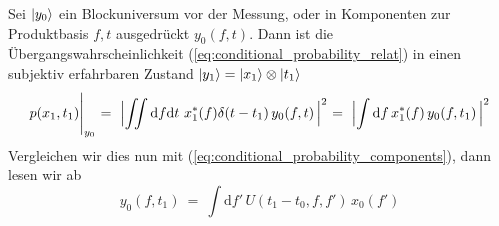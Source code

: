 \documentclass[12pt]{article}
\begin{document}
Sei $\ket{y_0}$ ein Blockuniversum vor der Messung, oder in Komponenten zur Produktbasis $f,t$ ausgedrückt $y_0(f,t)$. Dann ist die Übergangswahrscheinlichkeit (\ref{eq:conditional_probability_relat}) in einen subjektiv erfahrbaren Zustand $\ket{y_1} = \ket{x_1}\otimes\ket{t_1}$
\begin{equation} 
\label{eq:conditional_probability_subject}
p(x_1,t_1)\Biggl|_{y_0}\ =\ \Bigl| \iint \mathrm{d}f\mathrm{d}t\  x_1^*(f)\delta(t-t_1)\, y_0(f,t)\, \Bigl|^2
\ =\ \Bigl| \int \mathrm{d}f\, x_1^*(f)\, y_0(f,t_1)\, \Bigl|^2
\end{equation}
Vergleichen wir dies nun mit (\ref{eq:conditional_probability_components}), dann lesen wir ab
\begin{equation} 
y_0(f,t_1)\ =\ \int \mathrm{d}f'\, U(t_1-t_0,f,f')\, x_0(f')
\end{equation}
\end{document}
